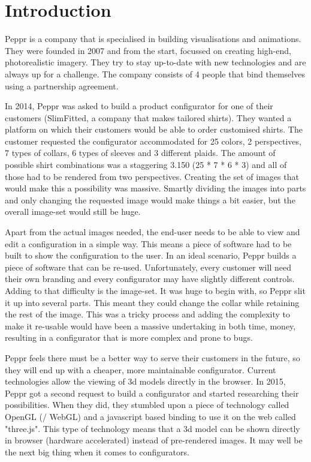 \chapter{Introduction}

Peppr is a company that is specialised in building visualisations and animations. They were founded in 2007 and from the start, focussed on creating high-end, photorealistic imagery. They try to stay up-to-date with new technologies and are always up for a challenge. The company consists of 4 people that bind themselves using a partnership agreement.

In 2014, Peppr was asked to build a product configurator for one of their customers (SlimFitted, a company that makes tailored shirts). They wanted a platform on which their customers would be able to order customised shirts. The customer requested the configurator accommodated for 25 colors, 2 perspectives, 7 types of collars, 6 types of sleeves and 3 different plaids. The amount of possible shirt combinations was a staggering 3.150 (25 * 7 * 6 * 3) and all of those had to be rendered from two perspectives. Creating the set of images that would make this a possibility was massive. Smartly dividing the images into parts and only changing the requested image would make things a bit easier, but the overall image-set would still be huge.

Apart from the actual images needed, the end-user needs to be able to view and edit a configuration in a simple way. This means a piece of software had to be built to show the configuration to the user. In an ideal scenario, Peppr builds a piece of software that can be re-used. Unfortunately, every customer will need their own branding and every configurator may have slightly different controls. Adding to that difficulty is the image-set. It was huge to begin with, so Peppr slit it up into several parts. This meant they could change the collar while retaining the rest of the image. This was a tricky process and adding the complexity to make it re-usable would have been a massive undertaking in both time, money, resulting in a configurator that is more complex and prone to bugs.

Peppr feels there must be a better way to serve their customers in the future, so they will end up with a cheaper, more maintainable configurator. Current technologies allow the viewing of 3d models directly in the browser. In 2015, Peppr got a second request to build a configurator and started researching their possibilities. When they did, they stumbled upon a piece of technology called OpenGL (/ WebGL) and a javascript based binding to use it on the web called "three.js". This type of technology means that a 3d model can be shown directly in browser (hardware accelerated) instead of pre-rendered images. It may well be the next big thing when it comes to configurators.

